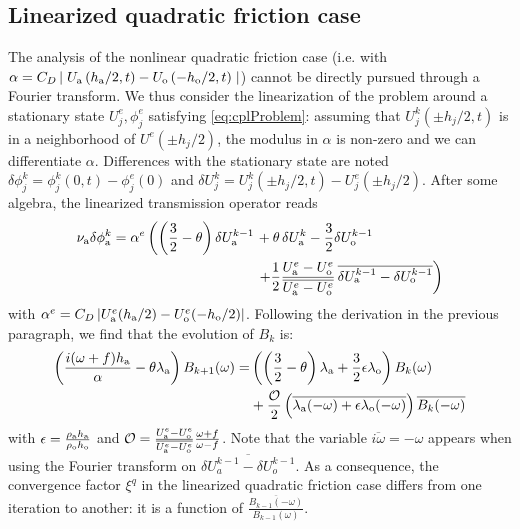 \subsection{Linearized quadratic friction case}
The analysis of the nonlinear quadratic friction case (i.e. with $\alpha = C_D\left|\right.U_{\rm a}\left(h_{\rm a} / 2, t\right) - U_{\rm o}\left(- h_{\rm o}/2, t\right)\left.\right|$)
cannot be directly pursued through a Fourier transform.
We thus consider the linearization of the problem 
around a stationary state $U^e_j, \phi^e_j$ satisfying \eqref{eq:cplProblem}:
assuming that $U^k_j (\pm h_j/2, t)$ is in a neighborhood of $U^e(\pm h_j/2)$, the modulus in $\alpha$
is non-zero and
we can differentiate $\alpha$.
Differences with the stationary state are noted $\delta \phi_j^k = \phi^k_j(0,t) - \phi_j^e(0)$ and $\delta U_j^k = U_j^k(\pm h_j/2, t) - U^e_j(\pm h_j/2)$.
After some algebra, the linearized transmission operator reads
\begin{equation}
\label{eq:linearised}
\begin{aligned}
\nu_{\rm a}\delta\phi_{\rm a}^k =  \alpha^e 
\left( \left(\frac{3}{2} - \theta \right)\delta U_{\rm a}^{k-1} \right.
&+ \theta\, \delta U_{\rm a}^{k}
- \frac{3}{2} \delta U_{\rm o}^{k-1}
\\
&\left.+ \frac{1}{2}\frac{U_{\rm a}^{{\color{black} e}} - U_{\rm o}^{{\color{black} e}}}{\overline{U_{\rm a}^{{\color{black} e}} - U_{\rm o}^{{\color{black} e}}}}\,
\overline{
\delta U_{\rm a}^{k-1} - \delta U_{\rm o}^{k-1}}
\right)
\end{aligned}
\end{equation}
with $\alpha^e=C_D\left|U_{\rm a}^e(h_{\rm a}/2) - U_{\rm o}^e(-h_{\rm o}/2)\right|$.
Following the derivation in the previous paragraph,
we find that the evolution of $B_k$ is:
\begin{equation}
	\label{eq:OASchwarz_ConvergenceAnalysis_linearizedCV}
	\begin{aligned}
    \left(\frac{i(\omega+f)h_{\rm a}}{\alpha} -
	\theta \lambda_{\rm a}\right)B_{k+1}(\omega)
		=&
    \left(\left(\frac{3}{2} - \theta\right) 
    \lambda_{\rm a}
    + \frac{3}{2} \epsilon \lambda_{\rm o} \right) B_k(\omega)\\
		&+ \frac{
    \mathcal{O}
    }{2}
    \left(
    \overline{
    \lambda_{\rm a}(-{\omega})
    +
    \epsilon\lambda_{\rm o}(-{\omega})}
    \right)
    \overline{B_k(-{\omega})}
\end{aligned}
\end{equation}
with $\epsilon = \frac{\rho_{\rm a} h_{\rm a}}{\rho_{\rm o} h_{\rm o}}$ 
and $\mathcal{O} = 
\frac{U_{\rm a}^e - U_{\rm o}^e}{\overline{U_{\rm a}^e - U_{\rm o}^e}} \frac{\omega+f}{\omega - f}$.
Note that the variable $\overline{i \omega}=-\omega$ appears when using the Fourier
transform on $\overline{\delta U_a^{k-1} - \delta U_o^{k-1}}$.
As a consequence,
the convergence factor $\xi^q$ in the linearized 
quadratic friction case differs from one iteration to another:
it is a function of
$\frac{\overline{B_{k-1}(-\omega)}}{B_{k-1}(\omega)}$.
